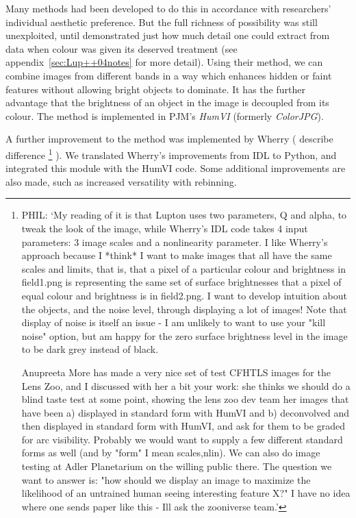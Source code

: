 \documentclass[letterpaper, 11pt]{article}
\def\MORE{{\color{red}{\bf MORE}}\xspace}
\begin{document}
Many methods had been developed to do this in accordance with researchers' individual aesthetic preference. But the full richness of possibility was still unexploited, until \citet{Lup++04} demonstrated just how much detail one could extract from data when colour was given its deserved treatment (see appendix~\ref{sec:Lup++04notes} for more detail). Using their method, we can combine images from different bands in a way which enhances hidden or faint features without allowing bright objects to dominate. It has the further advantage that the brightness of an object in the image is decoupled from its colour. The method is implemented in PJM's \emph{HumVI} (formerly \emph{ColorJPG}).

A further improvement to the method was implemented by Wherry (\MORE describe difference
\footnote{PHIL: `My reading of it is that Lupton uses two parameters, Q and alpha, to
tweak the look of the image, while Wherry's IDL code takes 4 input
parameters: 3 image scales and a nonlinearity parameter.
I like Wherry's approach because I *think* I want to make images that
all have the same scales and limits, that is, that a pixel of a
particular colour and brightness in field1.png is representing the
same set of surface brightnesses that a pixel of equal colour and
brightness is in field2.png. I want to develop intuition about the
objects, and the noise level, through displaying a lot of images! Note
that display of noise is itself an issue - I am unlikely to want to
use your "kill noise" option, but am happy for the zero surface
brightness level in the image to be dark grey instead of black.

Anupreeta More has made a very nice set of test CFHTLS images for the
Lens Zoo, and I discussed with her a bit your work: she thinks we
should do a blind taste test at some point, showing the lens zoo dev
team her images that have been a) displayed in standard form with
HumVI and b) deconvolved and then
displayed in standard form with HumVI, and ask for them to be graded
for arc visibility. Probably we would want to supply a few different
standard forms as well (and by "form" I mean {scales,nlin}). We can
also do image testing at Adler Planetarium on the willing public
there. The question we want to answer is: "how should we display an
image to maximize the likelihood of an untrained human seeing
interesting feature X?"  I have no idea where one sends paper like
this - Ill ask the zooniverse team.'}
). We translated Wherry's improvements from IDL to Python, and integrated this module with the HumVI code. Some additional improvements are also made, such as increased versatility with rebinning.
\end{document}
